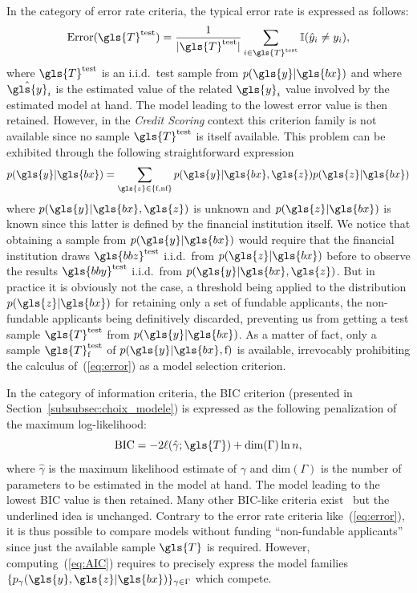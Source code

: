 In the category of error rate criteria, the typical error rate is expressed as follows:
\begin{equation} \label{eq:error}
\mbox{Error}(\gls{T}^\text{test}) = \frac{1}{|\gls{T}^\text{test}|} \sum_{i \in \gls{T}^\text{test}} \mathbb{I}(\hat y_i \neq y_i),
\end{equation} 
where $\gls{T}^\text{test}$ is an i.i.d.\ test sample from $p(\gls{y}|\gls{bx})$ and where $\hat{\gls{y}}_i$ is the estimated value of the related $\gls{y}_i$ value involved by the estimated model at hand. The model leading to the lowest error value is then retained. However, in the \textit{Credit Scoring} context this criterion family is not available since no sample $\gls{T}^\text{test}$ is itself available. This problem can be exhibited through the following straightforward expression
\begin{equation} \label{eq:error2}
p(\gls{y}|\gls{bx}) = \sum_{\gls{z}\in\{\text{f},\text{nf}\}} p(\gls{y}|\gls{bx},\gls{z}) p(\gls{z}|\gls{bx})
\end{equation}
where $p(\gls{y}|\gls{bx},\gls{z})$ is unknown and $p(\gls{z}|\gls{bx})$ is known since this latter is defined by the financial institution itself. We notice that obtaining a sample from $p(\gls{y}|\gls{bx})$ would require that the financial institution draws $\gls{bbz}^\text{test}$ i.i.d.\ from $p(\gls{z}|\gls{bx})$ before to observe the results $\gls{bby}^\text{test}$ i.i.d.\ from $p(\gls{y}|\gls{bx},\gls{z})$. But in practice it is obviously not the case, a threshold being applied to the distribution $p(\gls{z}|\gls{bx})$ for retaining only a set of fundable applicants, the non-fundable applicants being definitively discarded, preventing us from getting a test sample $\gls{T}^\text{test}$ from $p(\gls{y} | \gls{bx})$. As a matter of fact, only a sample $\gls{T}^\text{test}_{\text{f}}$ of $p(\gls{y}|\gls{bx},\text{f})$ is available, 
irrevocably prohibiting the calculus of~(\ref{eq:error}) as a model selection criterion.

In the category of information criteria, the BIC criterion (presented in Section~\ref{subsubsec:choix_modele}) is expressed as the following penalization of the maximum log-likelihood:
\begin{equation}\label{eq:AIC}
\mbox{BIC} = - 2 \ell(\hat\gamma;\gls{T}) + \text{dim}(\Gamma) \ln n,
\end{equation}
where $\hat\gamma$ is the maximum likelihood estimate of $\gamma$ and $\text{dim}(\Gamma)$ is the number of parameters to be estimated in the model at hand. The model leading to the lowest BIC value is then retained. Many other BIC-like criteria exist~\cite{vandewalle:tel-00447141} but the underlined idea is unchanged. Contrary to the error rate criteria like~(\ref{eq:error}), it is thus possible to compare models without funding ``non-fundable applicants'' since just the available sample $\gls{T}$ is required. However, computing~(\ref{eq:AIC}) requires to precisely express the model families $\{p_{\gamma}(\gls{y},\gls{z}|\gls{bx})\}_{\gamma \in \Gamma}$ which compete.

